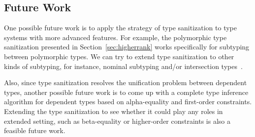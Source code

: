 \subsection{Future Work}

One possible future work is to apply the strategy of type sanitization to type
systems with more advanced features. For example, the polymorphic type
sanitization presented in Section~\ref{sec:higherrank} works specifically for
subtyping between polymorphic types. We can try to extend type sanitization to
other kinds of subtyping, for instance, nominal subtyping and/or intersection
types~\cite{}.

Also, since type sanitization resolves the unification problem between dependent
types, another possible future work is to come up with a complete type inference
algorithm for dependent types based on alpha-equality and first-order
constraints. Extending the type sanitization to see whether it could play
any roles in extended setting, such as beta-equality or higher-order constraints
is also a feasible future work.
